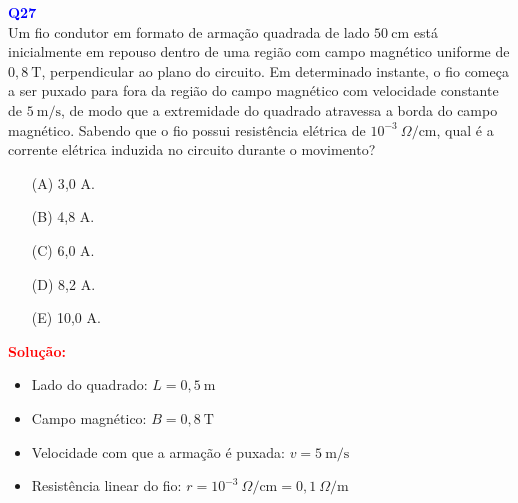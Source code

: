 \documentclass[a4paper,12pt]{article}
\begin{document}
\begin{flushleft}
\textbf{\textcolor{blue}{\Large Q27}}\\

Um fio condutor em formato de armação quadrada de lado $50 \ \text{cm}$ está inicialmente em repouso dentro 
de uma região com campo magnético uniforme de $0{,}8 \ \text{T}$, perpendicular ao plano do circuito. Em determinado instante, 
o fio começa a ser puxado para fora da região do campo magnético com velocidade constante de $5 \ \text{m/s}$, de modo que a 
extremidade do quadrado atravessa a borda do campo magnético. Sabendo que o fio possui resistência elétrica de $10^{-3} \ \Omega/\text{cm}$, 
qual é a corrente elétrica induzida no circuito durante o movimento?


\begin{itemize}
\item[(A)] 3{,}0 A.
\item[(B)] 4{,}8 A.  
\item[(C)] 6{,}0 A.
\item[(D)] 8{,}2 A.
\item[(E)] 10{,}0 A.
\end{itemize}

\vspace{0.5cm}

\textcolor{red}{\textbf{Solução:}}\\

\begin{itemize}
    \item Lado do quadrado: $L = 0,5 \ \text{m}$
    \item Campo magnético: $B = 0,8 \ \text{T}$
    \item Velocidade com que a armação é puxada: $v = 5 \ \text{m/s}$
    \item Resistência linear do fio: $r = 10^{-3} \ \Omega/\text{cm} = 0,1 \ \Omega/\text{m}$
\end{itemize}

\begin{center}
\end{center}
\end{flushleft}
\end{document}
